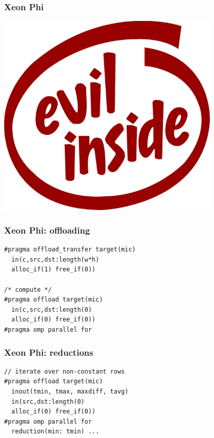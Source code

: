 \documentclass{beamer}
\begin{document}
\begin{frame}
 \frametitle{Xeon Phi}
 \includegraphics[width=0.8\textwidth]{evil-inside-752871.jpg}
\end{frame}

\begin{frame}[fragile]
 \frametitle{Xeon Phi: offloading}
\begin{verbatim}
#pragma offload_transfer target(mic)
  in(c,src,dst:length(w*h)
  alloc_if(1) free_if(0))

/* compute */
#pragma offload target(mic)
  in(c,src,dst:length(0)
  alloc_if(0) free_if(0))
#pragma omp parallel for
\end{verbatim}
\end{frame}

\begin{frame}[fragile]
 \frametitle{Xeon Phi: reductions}
\begin{verbatim}
// iterate over non-constant rows
#pragma offload target(mic)
  inout(tmin, tmax, maxdiff, tavg)
  in(src,dst:length(0)
  alloc_if(0) free_if(0))
#pragma omp parallel for
  reduction(min: tmin) ...

\end{verbatim}
\end{frame}
\end{document}
